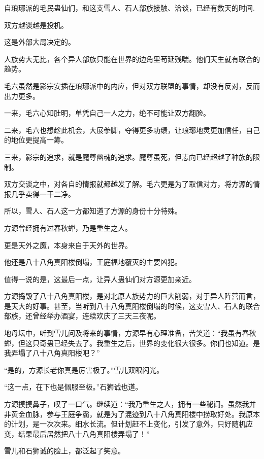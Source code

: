 
\begin{this_body}

自琅琊派的毛民蛊仙们，和这支雪人、石人部族接触、洽谈，已经有数天的时间.

双方越谈越是投机。

这是外部大局决定的。

人族势大无比，各个异人部族只能在世界的边角里苟延残喘。他们天生就有联合的趋势。

毛六虽然是影宗安插在琅琊派中的内应，但对双方联盟的事情，却没有反对，反而出力更多。

一来，毛六心知肚明，单凭自己一人之力，绝不可能让双方翻脸。

二来，毛六也想趁此机会，大展拳脚，夺得更多功绩，让琅琊地灵更加信任，自己的地位更提高一筹。

三来，影宗的追求，就是魔尊幽魂的追求。魔尊虽死，但志向已经超越了种族的限制。

双方交谈之中，对各自的情报就都越发了解。毛六更是为了取信对方，将方源的情报几乎卖得一干二净。

所以，雪人、石人这一方都知道了方源的身份十分特殊。

方源曾经拥有过春秋蝉，乃是重生之人。

更是天外之魔，本身来自于天外的世界。

他还是八十八角真阳楼倒塌，王庭福地覆灭的主要凶犯。

值得一说的是，这最后一点，让异人蛊仙们对方源更加亲近。

方源捣毁了八十八角真阳楼，是对北原人族势力的巨大削弱，对于异人阵营而言，是天大的好事。甚至，当听到八十八角真阳楼倒塌的时候，这支雪人、石人的联合部族，还曾经举办酒宴，连续欢庆了三天三夜呢。

地母坛中，听到雪儿问及将来的事情，方源早有心理准备，苦笑道：“我虽有春秋蝉，但这只奇蛊已经失去了。我重生之后，世界的变化很大很多。你们也知道。是我弄塌了八十八角真阳楼吧？”

“是的，方源长老你真是厉害极了。”雪儿双眼闪光。

“这一点，在下也是佩服至极。”石狮诚也道。

方源摸摸鼻子，叹了一口气。继续道：“我乃重生之人，拥有一些秘闻。虽然我并非黄金血脉，参与王庭争霸，就是为了混迹到八十八角真阳楼中捞取好处。我原本的计划，是一次次来。细水长流。但计划赶不上变化，引发了意外，只好随机应变，结果最后居然把八十八角真阳楼弄塌了！”

雪儿和石狮诚的脸上，都泛起了笑意。


\end{this_body}
